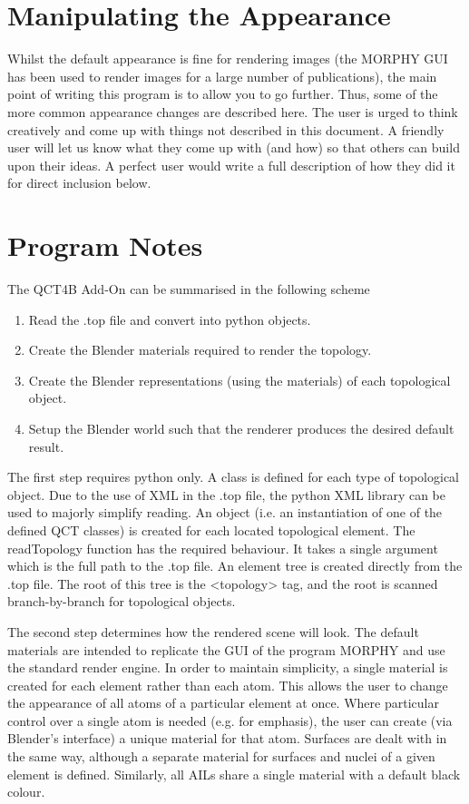 \documentclass{report}
\begin{document}
\chapter{Manipulating the Appearance}

Whilst the default appearance is fine for rendering images (the MORPHY GUI has been used to render images for 
a large number of publications), the main point of writing this program is to allow you to go further.
Thus, some of the more common appearance changes are described here. 
The user is urged to think creatively and come up with things not described in this document.
A friendly user will let us know what they come up with (and how) so that others can build upon their ideas.
A perfect user would write a full description of how they did it for direct inclusion below.

\chapter{Program Notes}

The QCT4B Add-On can be summarised in the following scheme

\begin{enumerate}

  \item Read the .top file and convert into python objects.
  \item Create the Blender materials required to render the topology.
  \item Create the Blender representations (using the materials) of each topological object.
  \item Setup the Blender world such that the renderer produces the desired default result.

\end{enumerate}

The first step requires python only. A class is defined for each type of topological object.
Due to the use of XML in the .top file, the python XML library can be used to majorly simplify reading.
An object (i.e. an instantiation of one of the defined QCT classes) is created for each located topological element.
The readTopology function has the required behaviour. It takes a single argument which is the full path to the 
.top file.
An element tree is created directly from the .top file. The root of this tree is the <topology> tag, and the 
root is scanned branch-by-branch for topological objects.


The second step determines how the rendered scene will look.
The default materials are intended to replicate the GUI of the program MORPHY and use the standard render engine.
In order to maintain simplicity, a single material is created for each element rather than each atom.
This allows the user to change the appearance of all atoms of a particular element at once.
Where particular control over a single atom is needed (e.g. for emphasis), the user can create 
(via Blender's interface) a unique material for that atom.
Surfaces are dealt with in the same way, although a separate material for surfaces and nuclei of a given 
element is defined.
Similarly, all AILs share a single material with a default black colour.
\end{document}
